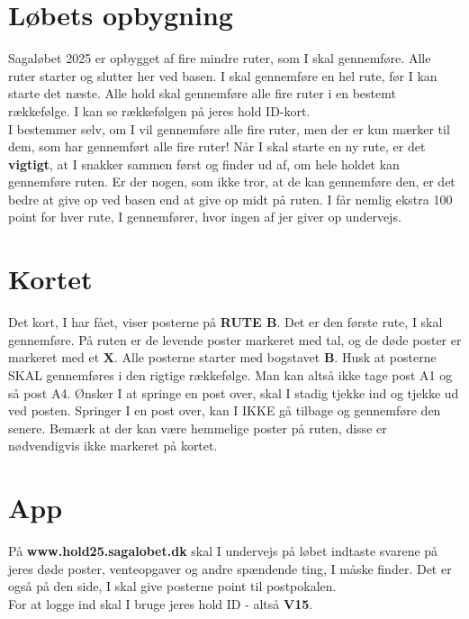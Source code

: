 \section{Løbets opbygning}
Sagaløbet 2025 er opbygget af fire mindre ruter, som I skal gennemføre. Alle ruter starter og slutter her ved basen. I skal gennemføre en hel rute, før I kan starte det næste. Alle hold skal gennemføre alle fire ruter i en bestemt rækkefølge. I kan se rækkefølgen på jeres hold ID-kort.\\\newline
I bestemmer selv, om I vil gennemføre alle fire ruter, men der er kun mærker til dem, som har gennemført alle fire ruter! Når I skal starte en ny rute, er det \textbf{vigtigt}, at I snakker sammen først og finder ud af, om hele holdet kan gennemføre ruten. Er der nogen, som ikke tror, at de kan gennemføre den, er det bedre at give op ved basen end at give op midt på ruten. I får nemlig ekstra 100 point for hver rute, I gennemfører, hvor ingen af jer giver op undervejs.\\
\section{Kortet}
Det kort, I har fået, viser posterne på \textbf{RUTE B}. Det er den første rute, I skal gennemføre. På ruten er de levende poster markeret med tal, og de døde poster er markeret med et \textbf{X}. Alle posterne starter med bogstavet \textbf{B}. Husk at posterne SKAL gennemføres i den rigtige rækkefølge. Man kan altså ikke tage post A1 og så post A4. Ønsker I at springe en post over, skal I stadig tjekke ind og tjekke ud ved posten. Springer I en post over, kan I IKKE gå tilbage og gennemføre den senere. Bemærk at der kan være hemmelige poster på ruten, disse er nødvendigvis ikke markeret på kortet.
\section{App}
På \textbf{www.hold25.sagalobet.dk} skal I undervejs på løbet indtaste svarene på jeres døde poster, venteopgaver og andre spændende ting, I måske finder. Det er også på den side, I skal give posterne point til postpokalen.\\
For at logge ind skal I bruge jeres hold ID - altså \textbf{V15}.
\newpage
